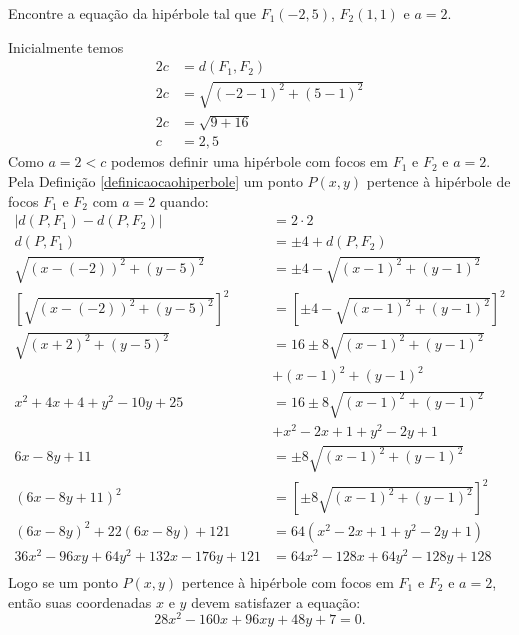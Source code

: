 \begin{exemplo}
    Encontre a equação da hipérbole tal que $F_1(-2, 5)$, $F_2(1, 1)$ e $a = 2$.
    \begin{solucao}
        Inicialmente temos
        \begin{align*}
            2c & = d(F_1, F_2)                   \\
            2c & = \sqrt{(-2 - 1)^2 + (5 - 1)^2} \\
            2c & = \sqrt{9 + 16}                 \\
            c  & = 2,5
        \end{align*}
        Como $a = 2 < c$ podemos definir uma hipérbole com focos em $F_1$ e $F_2$ e $a = 2$. Pela Definição \ref{definicaocaohiperbole} um ponto $P(x, y)$
        pertence à hipérbole de focos $F_1$ e $F_2$ com $a = 2$ quando:
        \begin{align*}
            |d(P, F_1) - d(P, F_2)|                         & = 2\cdot 2                                            \\
            d(P, F_1)                                       & = \pm 4 + d(P, F_2)                                   \\
            \sqrt{(x - (-2))^2 + (y - 5)^2}                 & = \pm 4 - \sqrt{(x - 1)^2 + (y - 1)^2}                \\
            \left[ \sqrt{(x - (-2))^2 + (y - 5)^2}\right]^2 & = \left[\pm 4 - \sqrt{(x - 1)^2 + (y - 1)^2}\right]^2 \\
            \sqrt{(x + 2)^2 + (y - 5)^2}                    & = 16 \pm 8\sqrt{(x - 1)^2 + (y - 1)^2}                \\ &+ (x - 1)^2 + (y - 1)^2       \\
            x^2 + 4x + 4 + y^2 - 10y + 25                   & = 16 \pm 8\sqrt{(x - 1)^2 + (y - 1)^2}                \\ &+ x^2 - 2x + 1 + y^2 - 2y + 1 \\
            6x - 8y + 11                                    & = \pm 8\sqrt{(x - 1)^2 + (y - 1)^2}                   \\
            (6x - 8y + 11)^2                                & = \left[\pm 8\sqrt{(x - 1)^2 + (y - 1)^2}\right]^2    \\
            (6x - 8y)^2 + 22(6x - 8y) + 121                 & = 64(x^2 - 2x + 1 + y^2 - 2y + 1)                     \\
            36x^2 - 96xy + 64y^2 + 132x - 176y + 121        & = 64x^2 - 128x + 64y^2 - 128y + 128                   \\
        \end{align*}
        Logo se um ponto $P(x, y)$ pertence à hipérbole com focos em $F_1$ e $F_2$ e $a = 2$, então suas coordenadas $x$ e $y$ devem satisfazer a equação:
        \[
            28x^2 - 160x + 96xy + 48y + 7 = 0.
        \]
    \end{solucao}
\end{exemplo}

